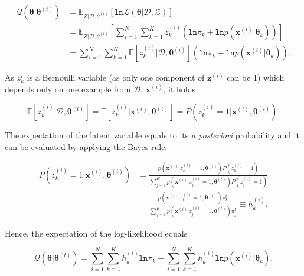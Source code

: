 \begin{equation}
	\begin{split}
		\mathcal{Q}(\boldsymbol \theta | \boldsymbol \theta^{(t)}) &= \mathbb{E}_{\mathit{Z} | \mathcal{D}, \theta^{(t)}}[ \mathtt{ln}\mathcal{L}(\boldsymbol \theta | \mathcal{D}, \mathcal{Z}) ] \\
		&= \mathbb{E}_{\mathit{Z} | \mathcal{D}, \theta^{(t)}} \left [ \sum_{i=1}^N \sum_{k=1}^K z_k^{(i)} \left ( \mathtt{ln}\pi_k + \mathtt{ln}p(\mathbf{x}^{(i)} | \boldsymbol \theta_k)  \right ) \right ] \\
		&= \sum_{i=1}^N \sum_{k=1}^K \mathbb{E} \left [ z_k^{(i)} | \mathcal{D}, \boldsymbol \theta^{(i)} \right ] \left ( \mathtt{ln}\pi_k + \mathtt{ln}p(\mathbf{x}^{(i)} | \boldsymbol \theta_k)  \right ).
	\end{split}
\end{equation}

As $z_k^{i}$ is a Bernoulli variable (as only one component of $\mathbf{z}^{(i)}$ can be 1) which depends only on one example from $\mathcal{D}$, $\mathbf{x}^{(i)}$, it holds

\begin{equation}
	\mathbb{E} \left [ z_k^{(i)} | \mathcal{D}, \boldsymbol \theta^{(t)}  \right ] = \mathbb{E} \left [ z_k^{(i)} | \mathbf{x}^{(i)}, \boldsymbol \theta^{(t)}  \right ] = P(z_k^{(i)} = 1 | \mathbf{x}^{(i)}, \boldsymbol \theta^{(i)}).
\end{equation}

The expectation of the latent variable equals to its \textit{a posteriori } probability and it can be evaluated by applying the Bayes rule:

\begin{equation}
	\begin{split}
		P(z_k^{(i)} = 1 | \mathbf{x}^{(i)}, \boldsymbol \theta^{(i)}) &= \frac{p(\mathbf{x}^{(i)}| z_k^{(i)} = 1, \boldsymbol \theta^{(t)})P(z_k^{(i)}=1)}{ \sum_{j=1}^{K} p(\mathbf{x}^{(i)}| z_j^{(i)} = 1, \boldsymbol \theta^{(t)})P(z_j^{(i)}=1) } \\
		&= \frac{p(\mathbf{x}^{(i)}| z_k^{(i)} = 1, \boldsymbol \theta^{(t)})\pi_k^t}{\sum_{j=1}^{K} p(\mathbf{x}^{(i)}| z_j^{(i)} = 1, \boldsymbol \theta^{(t)})\pi_j^t} \equiv h_k^{(i)}.
	\end{split}
\end{equation}

Hence, the expectation of the log-likelihood equals

\begin{equation}
	\mathcal{Q}(\boldsymbol \theta | \boldsymbol \theta^{(t)}) = \sum_{i=1}^N \sum_{k=1}^K h_k^{(i)}\mathtt{ln}\pi_k + \sum_{i=1}^N \sum_{k=1}^K h_k^{(i)}\mathtt{ln}p(\mathbf{x}^{(i)} | \boldsymbol \theta_k).
	\label{eq:LogLik}
\end{equation}


